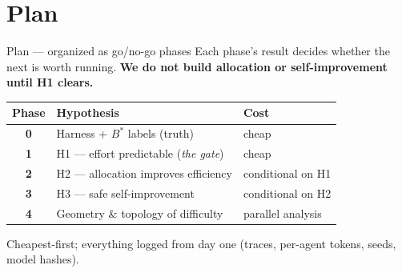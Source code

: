\documentclass[aspectratio=169,12pt,t,compress]{beamer}
\newcommand{\good}[1]{\cellcolor{HSEGreen!18}#1}
\begin{document}
\section{Plan}

\begin{frame}{Plan --- organized as go/no-go phases}
	Each phase's result decides whether the next is worth running.
	\textbf{We do not build allocation or self-improvement until H1 clears.}

	\vspace{0.5em}
	\begin{center}
		\small
		\renewcommand{\arraystretch}{1.25}
		\begin{tabular}{c l l}
			\toprule
			\textbf{Phase} & \textbf{Hypothesis}            & \textbf{Cost}        \\
			\midrule
			\textbf{0}     & Harness + $B^*$ labels (truth) & cheap                \\
			\textbf{1}     & \good{H1 --- effort predictable (\emph{the gate})} & cheap    \\
			\textbf{2}     & H2 --- allocation improves efficiency & conditional on H1 \\
			\textbf{3}     & H3 --- safe self-improvement   & conditional on H2    \\
			\textbf{4}     & Geometry \& topology of difficulty & parallel analysis \\
			\bottomrule
		\end{tabular}
	\end{center}

	\vspace{0.4em}
	\footnotesize Cheapest-first; everything logged from day one (traces,
	per-agent tokens, seeds, model hashes).
\end{frame}
\end{document}
